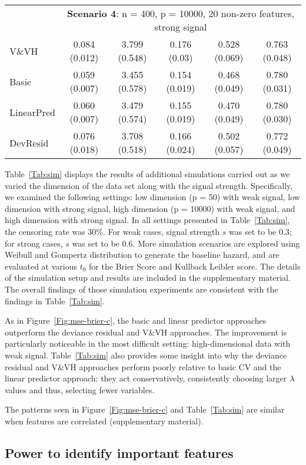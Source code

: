 \begin{table}[!htb]
\begin{tabular}[t]{lccccc}
\addlinespace
&\multicolumn{5}{c}{\textbf{Scenario 4}: n = 400, p = 10000, 20 non-zero features, strong signal}\\
\cline{2-6}
V\&VH  & 0.084 (0.012) & 3.799 (0.548) & 0.176 (0.03) & 0.528 (0.069) & 0.763 (0.048) \\
Basic  & 0.059 (0.007) & 3.455 (0.578) & 0.154 (0.019) & 0.468 (0.049) & 0.780 (0.031) \\
LinearPred  & 0.060 (0.007) & 3.479 (0.574) & 0.155 (0.019) & 0.470 (0.049) & 0.780 (0.030) \\
DevResid  & 0.076 (0.018) & 3.708 (0.518) & 0.166 (0.024) & 0.502 (0.057) & 0.772 (0.049) \\
\bottomrule
\end{tabular}
\end{table}

Table~\ref{Tab:sim} displays the results of additional simulations carried out as we varied the dimension of the data set along with the signal strength.  Specifically, we examined the following settings: low dimension (p = 50) with weak signal, low dimension with strong signal, high dimension (p = 10000) with weak signal, and high dimension with strong signal. In all settings presented in Table~\ref{Tab:sim}, the censoring rate was 30\%. For weak cases, signal strength $s$ was set to be 0.3; for strong cases, $s$ was set to be 0.6. More simulation scenarios are explored using Weibull and Gompertz distribution to generate the baseline hazard, and are evaluated at various $t_0$ for the Brier Score and Kullback Leibler score. The details of the simulation setup and results are included in the supplementary material. The overall findings of those simulation experiments are consistent with the findings in Table~\ref{Tab:sim}.

As in Figure~\ref{Fig:mse-brier-c}, the basic and linear predictor approaches outperform the deviance residual and V\&VH approaches.  The improvement is particularly noticeable in the most difficult setting: high-dimensional data with weak signal.  Table~\ref{Tab:sim} also provides some insight into why the deviance residual and V\&VH approaches perform poorly relative to basic CV and the linear predictor approach: they act conservatively, consistently choosing larger $\lambda$ values and thus, selecting fewer variables.

The patterns seen in Figure~\ref{Fig:mse-brier-c} and Table~\ref{Tab:sim} are similar when features are correlated (supplementary material).

\subsection{Power to identify important features}
\label{Sec:power}

